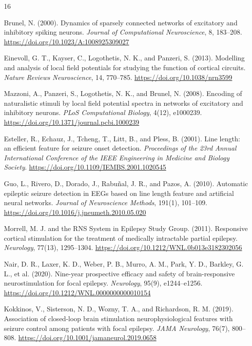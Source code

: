\documentclass[12pt]{article}
\begin{document}
\begin{thebibliography}{16}

Brunel, N. (2000).
Dynamics of sparsely connected networks of excitatory and inhibitory spiking neurons.
\textit{Journal of Computational Neuroscience}, 8, 183--208.
\url{https://doi.org/10.1023/A:1008925309027}

Einevoll, G. T., Kayser, C., Logothetis, N. K., and Panzeri, S. (2013).
Modelling and analysis of local field potentials for studying the function of cortical circuits.
\textit{Nature Reviews Neuroscience}, 14, 770--785.
\url{https://doi.org/10.1038/nrn3599}

Mazzoni, A., Panzeri, S., Logothetis, N. K., and Brunel, N. (2008).
Encoding of naturalistic stimuli by local field potential spectra in networks of excitatory and inhibitory neurons.
\textit{PLoS Computational Biology}, 4(12), e1000239.
\url{https://doi.org/10.1371/journal.pcbi.1000239}

Esteller, R., Echauz, J., Tcheng, T., Litt, B., and Pless, B. (2001).
Line length: an efficient feature for seizure onset detection.
\textit{Proceedings of the 23rd Annual International Conference of the IEEE Engineering in Medicine and Biology Society}.
\url{https://doi.org/10.1109/IEMBS.2001.1020545}

Guo, L., Rivero, D., Dorado, J., Rabu\~{n}al, J. R., and Pazos, A. (2010).
Automatic epileptic seizure detection in EEGs based on line length feature and artificial neural networks.
\textit{Journal of Neuroscience Methods}, 191(1), 101--109.
\url{https://doi.org/10.1016/j.jneumeth.2010.05.020}

Morrell, M. J. and the RNS System in Epilepsy Study Group. (2011).
Responsive cortical stimulation for the treatment of medically intractable partial epilepsy.
\textit{Neurology}, 77(13), 1295--1304.
\url{https://doi.org/10.1212/WNL.0b013e3182302056}

Nair, D. R., Laxer, K. D., Weber, P. B., Murro, A. M., Park, Y. D., Barkley, G. L., et al. (2020).
Nine-year prospective efficacy and safety of brain-responsive neurostimulation for focal epilepsy.
\textit{Neurology}, 95(9), e1244--e1256.
\url{https://doi.org/10.1212/WNL.0000000000010154}

Kokkinos, V., Sisterson, N. D., Wozny, T. A., and Richardson, R. M. (2019).
Association of closed-loop brain stimulation neurophysiological features with seizure control among patients with focal epilepsy.
\textit{JAMA Neurology}, 76(7), 800--808.
\url{https://doi.org/10.1001/jamaneurol.2019.0658}


\end{thebibliography}
\end{document}
